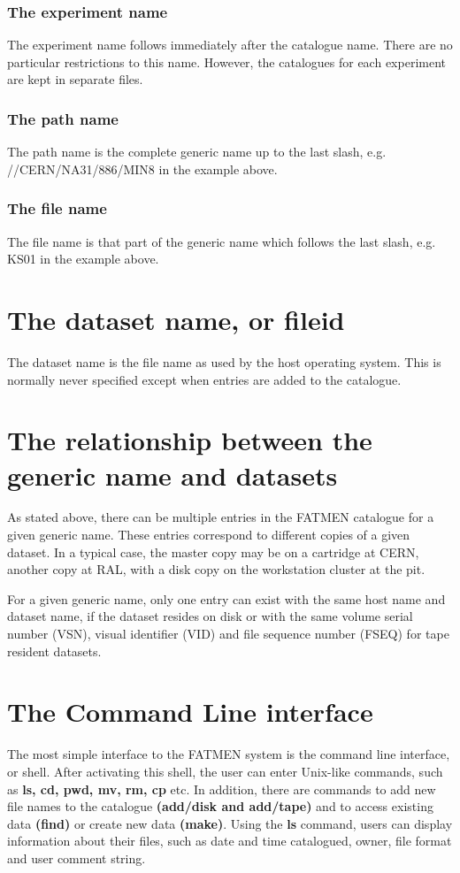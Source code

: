 \subsubsection{The experiment name}
\par
The experiment name follows immediately after the catalogue
name. There are no particular restrictions to this name.
However, the catalogues for each experiment are kept in separate
files.
\subsubsection{The path name}
\par
The path name is the complete generic name up to the last slash,
e.g. //CERN/NA31/886/MIN8 in the example above.
\subsubsection{The file name}
\par
The file name is that part of the generic name which follows the
last slash, e.g. KS01 in the example above.
\section{The dataset name, or fileid}
\par
The dataset name is the file name as used by the host operating system.
This is normally never specified except when entries are added to the
catalogue. 
\section{The relationship between the generic name and datasets}
\par
As stated above, there can be multiple entries in the FATMEN catalogue
for a given generic name. These entries correspond to different copies
of a given dataset. In a typical case, the master copy may be on 
a cartridge at CERN, another copy at RAL, with a disk copy on the 
workstation cluster at the pit. 
\par
For a given generic name, only one entry can exist with the same
host name and dataset name, if the dataset resides on disk
or with the same 
volume serial number (VSN), visual identifier (VID) and file sequence
number (FSEQ) for tape resident datasets.
\section{The Command Line interface}
\par
{}
The most simple interface to the FATMEN system is the command line
interface, or shell. After activating this shell, the user can enter
Unix-like commands, such as {\bf ls, cd, pwd, mv, rm, cp } etc.
In addition, there are commands to add new file names to the
catalogue {\bf (add/disk
and add/tape)}
and to access existing data {\bf (find)} or create new data
{\bf (make)}.
Using the {\bf ls} command, users can display information
about their files, such as date and time catalogued, owner, file format
and user comment string.

